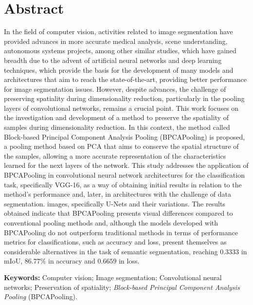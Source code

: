\section*{Abstract}
\thispagestyle{empty}
In the field of computer vision, activities related to image segmentation have provided advances in more accurate medical analysis, scene understanding, autonomous systems projects, among other similar studies, which have gained breadth due to the advent of artificial neural networks and deep learning techniques, which provide the basis for the development of many models and architectures that aim to reach the state-of-the-art, providing better performance for image segmentation issues.
However, despite advances, the challenge of preserving spatiality during dimensionality reduction, particularly in the pooling layers of convolutional networks, remains a crucial point. This work focuses on the investigation and development of a method to preserve the spatiality of samples during dimensionality reduction. In this context, the method called Block-based Principal Component Analysis Pooling (BPCAPooling) is proposed, a pooling method based on PCA that aims to conserve the spatial structure of the samples, allowing a more accurate representation of the characteristics learned for the next layers of the network.
This study addresses the application of BPCAPooling in convolutional neural network architectures for the classification task, specifically VGG-16, as a way of obtaining initial results in relation to the method's performance and, later, in architectures with the challenge of data segmentation. images, specifically U-Nets and their variations. The results obtained indicate that BPCAPooling presents visual differences compared to conventional pooling methods and, although the models developed with BPCAPooling do not outperform traditional methods in terms of performance metrics for classifications, such as accuracy and loss, present themselves as considerable alternatives in the task of semantic segmentation, reaching $0.3333$ in mIoU, $86.77\%$ in accuracy and $0.6659$ in loss.

\textbf{Keywords:} Computer vision; Image segmentation; Convolutional neural networks; Preservation of spatiality; \textit{Block-based Principal Component Analysis Pooling} (BPCAPooling).